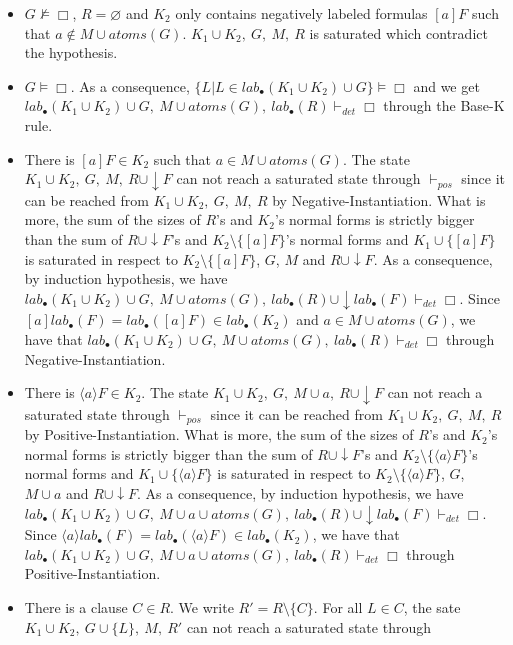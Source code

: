 \documentclass[a4paper,10pt]{article}
\newcommand{\atoms}{\mathit{atoms}}
\newcommand{\pos}{\vdash_\mathit{pos}}
\newcommand{\dett}{\vdash_\mathit{det}}
\newcommand{\T}{\mathit{lab}}
\begin{document}
\begin{itemize}
 \item $G\nvDash\Box$, $R=\varnothing$ and $K_2$ only contains negatively
labeled formulas $[a]F$ such that $a\notin M\cup \atoms(G)$. $K_1\cup K_2,\ G,\ M,\ R$ is saturated
which contradict the hypothesis.
 \item $G\vDash\Box$.
As a consequence, $\{L |L\in \T_\bullet(K_1\cup K_2)\cup G\}\vDash\Box$ and we get
$\T_\bullet(K_1\cup K_2)\cup G,\ M\cup\atoms(G),\ \T_\bullet(R)\dett\Box$ through the
{\sc Base-K} rule.
 \item There is $[a]F\in K_2$ such that $a\in M\cup \atoms(G)$.
The state $K_1\cup K_2,\ G,\ M,\ R\cup\downarrow F$ can not reach
a saturated state through $\pos$ since it can be reached from $K_1\cup K_2,\ G,\ M,\ R$ by
{\sc Negative-Instantiation}. What is more, the sum of the sizes of $R$'s and $K_2$'s normal forms
is strictly bigger than the sum of $R\cup\downarrow F$'s and $K_2\setminus\{[a]F\}$'s normal forms
and $K_1\cup\{[a]F\}$ is saturated in respect to $K_2\setminus\{[a]F\}$, $G$, $M$ and
$R\cup\downarrow F$. As a consequence,
by induction hypothesis, we have $\T_\bullet(K_1\cup K_2)\cup G,\ M\cup\atoms(G),\
\T_\bullet(R)\cup\downarrow \T_\bullet(F)\dett\Box$.
Since $[a]\T_\bullet(F)=\T_\bullet([a]F)\in \T_\bullet(K_2)$ and $a\in M\cup\atoms(G)$,
we have that $\T_\bullet(K_1\cup K_2)\cup G,\ M\cup\atoms(G),\ \T_\bullet(R)\dett\Box$
through {\sc Negative-Instantiation}.
 \item There is $\langle a\rangle F\in K_2$.
The state $K_1\cup K_2,\ G,\ M\cup a,\ R\cup\downarrow F$ can not
reach a saturated state through $\pos$ since it can be reached from $K_1\cup K_2,\ G,\ M,\ R$ by
{\sc Positive-Instantiation}. What is more, the sum of the sizes of $R$'s and $K_2$'s normal forms
is strictly bigger than the sum of $R\cup\downarrow F$'s and $K_2\setminus\{\langle a\rangle F\}$'s
normal forms and $K_1\cup\{\langle a\rangle F\}$ is saturated in respect to
$K_2\setminus\{\langle a\rangle F\}$, $G$, $M\cup a$ and $R\cup\downarrow F$. As a consequence,
by induction hypothesis, we have $\T_\bullet(K_1\cup K_2)\cup G,\ M\cup a\cup\atoms(G),\
\T_\bullet(R)\cup\downarrow \T_\bullet(F)\dett\Box$.
Since $\langle a\rangle \T_\bullet(F)=\T_\bullet(\langle a\rangle F)\in \T_\bullet(K_2)$,
we have that $\T_\bullet(K_1\cup K_2)\cup G,\ M\cup a\cup\atoms(G),\ \T_\bullet(R)\dett\Box$
through {\sc Positive-Instantiation}.
 \item There is a clause $C\in R$. We write $R'=R\setminus\{C\}$.
For all $L\in C$, the sate $K_1\cup K_2,\ G\cup\{L\},\ M,\ R'$ can not reach a saturated state through

\end{itemize}
\end{document}
